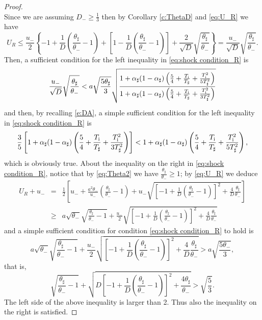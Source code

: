 \documentclass[10pt,a4paper]{article}
\numberwithin{equation}{section}
\newcommand{\Ti}{T_{\rm i}}
\begin{document}
\begin{proof}
\begin{equation}
\end{equation}
Since we are assuming $D_-\ge\frac13$ then by Corollary \ref{c:ThetaD} and \eqref{eq:U_R} we have
$$
  U_R \leq \frac{u_-}{2}\left\{{\textstyle - 1 + \frac{1}{D}\left(\frac{\theta_\sharp}{\theta_-} - 1\right) + \left[1 - \frac{1}{D}\left(\frac{\theta_\sharp}{\theta_-} - 1\right)\right] + {\textstyle \frac{2}{\sqrt{D}}\sqrt{\frac{\theta_\sharp}{\theta_-}}}}\right\} = \frac{u_-}{\sqrt{D}}\sqrt{\frac{\theta_\sharp}{\theta_-}}.
$$
Then, a sufficient condition for the left inequality in \eqref{eq:shock condition_R} is
$$
    \frac{u_-}{\sqrt{D}}\sqrt{\frac{\theta_\sharp}{\theta_-}}  < a\sqrt{\frac{5\theta_\sharp}{3}}\sqrt{\frac{1 + \alpha_\sharp(1 - \alpha_\sharp)\left(\frac{5}{4} + \frac{\Ti}{T_\sharp} + \frac{\Ti^2}{5T_\sharp^2}\right)}{1 + \alpha_\sharp(1 - \alpha_\sharp)\left(\frac{5}{4} + \frac{\Ti}{T_\sharp} + \frac{\Ti^2}{3T_\sharp^2}\right)}}
$$
and then, by recalling \eqref{e:DA}, a simple sufficient condition for the left inequality in \eqref{eq:shock condition_R} is
$$
\frac{3}{5}\left[1 + \alpha_\sharp(1 - \alpha_\sharp)\left(\frac{5}{4} + \frac{\Ti}{T_\sharp} + \frac{\Ti^2}{3T_\sharp^2}\right)\right] <  1 + \alpha_\sharp(1 - \alpha_\sharp)\left(\frac{5}{4} + \frac{\Ti}{T_\sharp} + \frac{\Ti^2}{5T_\sharp^2}\right),
$$
which is obviously true. About the inequality on the right in \eqref{eq:shock condition_R}, 
 notice that by \eqref{eq:Theta2} we have $\frac{\theta_\sharp}{\theta_-} \geq 1$; by \eqref{eq:U_R} we deduce
\begin{eqnarray*}
 U_R + u_- &=& \frac{1}{2}\left[{\textstyle u_- + \frac{a^2\theta_-}{u_-}\left(\frac{\theta_\sharp}{\theta_-} - 1\right) + u_-\sqrt{\left[- 1 + \frac{1}{D}\left(\frac{\theta_\sharp}{\theta_-} - 1\right)\right]^{\! 2} + {\textstyle \frac{4}{D}\frac{\theta_\sharp}{\theta_-}}}}\right]\\
 &\geq& {\textstyle a \sqrt{\theta_-}\sqrt{\frac{\theta_\sharp}{\theta_-} - 1}  + \frac{u_-}{2}\sqrt{\left[- 1 + \frac{1}{D}\left(\frac{\theta_\sharp}{\theta_-} - 1\right)\right]^{\! 2} + {\textstyle \frac{4}{D}\frac{\theta_\sharp}{\theta_-}}}}
\end{eqnarray*}
and a simple sufficient condition for condition \eqref{eq:shock condition_R} to hold is
$$
   {\textstyle a \sqrt{\theta_-}\sqrt{\frac{\theta_\sharp}{\theta_-} - 1}  + \frac{u_-}{2}\sqrt{\left[- 1 + \frac{1}{D}\left(\frac{\theta_\sharp}{\theta_-} - 1\right)\right]^{\! 2} + {\textstyle \frac{4}{D}\frac{\theta_\sharp}{\theta_-}}}} 
> a\sqrt{\frac{5\theta_-}{3}},
$$
that is,
$$
    {\textstyle \sqrt{\frac{\theta_\sharp}{\theta_-} - 1}  + \sqrt{D\left[- 1 + \frac{1}{D}\left(\frac{\theta_\sharp}{\theta_-} - 1\right)\right]^{\! 2} + {\textstyle \frac{4\theta_\sharp}{\theta_-}}}} 
> \sqrt{\frac{5}{3}}.
$$
The left side of the above inequality is larger than 2. Thus also the inequality on the right is satisfied.
\end{proof}
\end{document}
